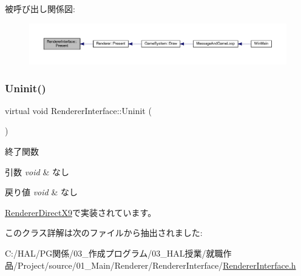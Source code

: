 被呼び出し関係図\+:\nopagebreak
\begin{figure}[H]
\begin{center}
\leavevmode
\includegraphics[width=350pt]{class_renderer_interface_aa9e12d2a2f5ffa351c457cfc7806b6f1_icgraph}
\end{center}
\end{figure}
\mbox{\label{class_renderer_interface_ada105489f9db98e7e9542b278699d558}} 
\subsubsection{\texorpdfstring{Uninit()}{Uninit()}}
{\footnotesize\ttfamily virtual void Renderer\+Interface\+::\+Uninit (\begin{DoxyParamCaption}{ }\end{DoxyParamCaption})\hspace{0.3cm}{\ttfamily [pure virtual]}}



終了関数 


\begin{DoxyParams}{引数}
{\em void} & なし \\
\hline
\end{DoxyParams}

\begin{DoxyRetVals}{戻り値}
{\em void} & なし \\
\hline
\end{DoxyRetVals}


\mbox{\hyperlink{class_renderer_direct_x9_af7ff314cbaa894d71e37c10565002f8f}{Renderer\+Direct\+X9}}で実装されています。



このクラス詳解は次のファイルから抽出されました\+:\begin{DoxyCompactItemize}
\item 
C\+:/\+H\+A\+L/\+P\+G関係/03\+\_\+作成プログラム/03\+\_\+\+H\+A\+L授業/就職作品/\+Project/source/01\+\_\+\+Main/\+Renderer/\+Renderer\+Interface/\mbox{\hyperlink{_renderer_interface_8h}{Renderer\+Interface.\+h}}\end{DoxyCompactItemize}
